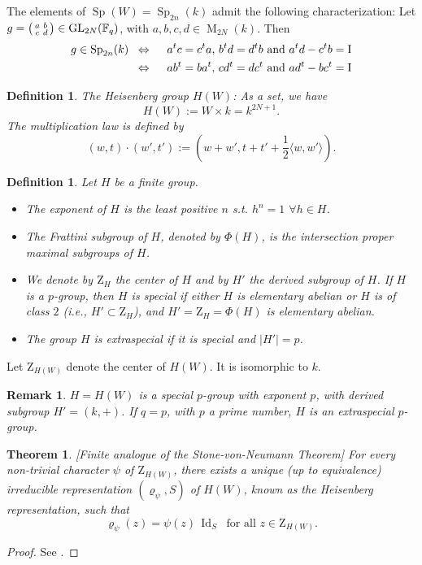 \documentclass[12pt]{amsart}
\numberwithin{equation}{subsection}
\newtheorem{defn}[equation]{Definition}
\newtheorem{remark}[equation]{Remark}
\newtheorem{thm}[equation]{Theorem}
\newcommand{\Fq}{{\mathbb{F}_q}}
\newcommand{\Id}{\operatorname{Id}}
\newcommand{\rI}{\mathrm{I}}
\newcommand{\rZ}{{\mathrm{Z}}}
\newcommand{\GL}{\mathrm{GL}}
\newcommand{\Sp}{\operatorname{Sp}}
\newcommand{\Mat}{\operatorname{M}}
\begin{document}
The elements of $\Sp(W)=\Sp_{2n}(k)$ admit the following characterization:
Let $g=\left(\begin{smallmatrix} a& b\cr c& d\end{smallmatrix}\right)\in\GL_{2N}(\Fq)$, with $a,b,c,d\in\Mat_{2N}(k)$. Then 
\begin{align*}
g\in \Sp_{2n}(k)&\;\;\Leftrightarrow\;\;&\text{$a^t c=c^t a$, $b^t d=d^t b$ and $a^t d-c^t b=\rI$}\cr
&\;\;\Leftrightarrow\;\;&\text{$ab^t=ba^t$, $cd^t=dc^t$ and $ad^t -bc^t=\rI$}
\end{align*}

\begin{defn} \label{defn:Heis}
{\rm The Heisenberg group $H(W)$:
As a set, we have
\[H(W):=W\times k=k^{2N+1}.\] 
The multiplication law is defined by
\[(w,t)\cdot (w',t'):=(w+w',t+t'+\frac{1}{2}\langle w,w'\rangle).\]}
\end{defn}

\begin{defn}  {\rm Let $H$ be a finite group. 
\begin{itemize}
\item
The \textit{exponent} of  $H$  is the least positive $n$ s.t. $h^n=1$ $\forall h\in H$.
\item
The \textit{Frattini subgroup} of $H$, denoted by $\Phi(H)$, is  the intersection proper maximal subgroups of $H$.
\item
We denote by $\rZ_H$ the center of $H$ and by $H'$ the derived subgroup of $H$.  
If $H$  is a $p$-group, then $H$ is \textit{special} if either $H$ is elementary abelian or $H$ is of class $2$ (i.e., $H' \subset\rZ_H$), and $H'= \rZ_H = \Phi(H)$ is elementary
abelian. 
\item
The group $H$ is  \textit{extraspecial} if it is special and $|H'|=p$.
\end{itemize} }
\end{defn}

Let  $\rZ_{H(W)}$ denote the center of $H(W)$. It  is isomorphic to $k$.
\begin{remark} {\rm $H=H(W)$ is a special $p$-group with exponent $p$, with derived subgroup $H'=(k,+)$. If $q=p$, with $p$ a prime number, $H$ is an 
extraspecial $p$-group.}
\end{remark}

\begin{thm} \label{thm:StonevN} {\rm [Finite analogue of the Stone-von-Neumann Theorem]} 
For every non-trivial character $\psi$ of $\rZ_{H(W)}$,  there exists a unique  (up to equivalence) irreducible representation $(\varrho_\psi,S)$ of $H(W)$,  known as the \textit{Heisenberg representation}, such that 
\[\varrho_\psi(z)=\psi(z)\,\Id_S\;\;\text{for all $z\in\rZ_{H(W)}$.}\]
\end{thm}
\begin{proof}
See  \cite[Theorem~2.I.2]{MVW}.
\end{proof}
\end{document}
